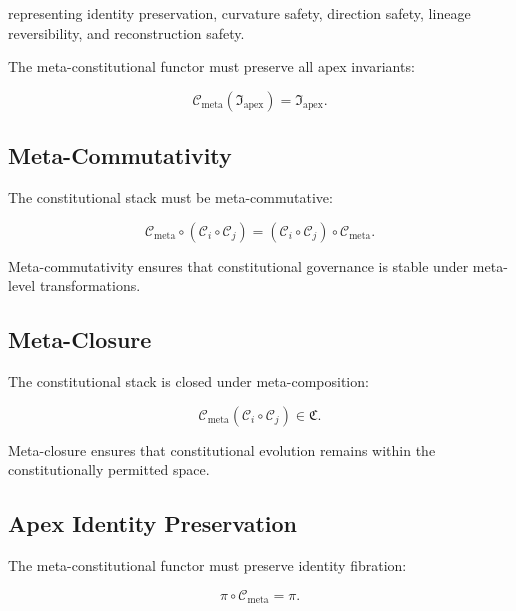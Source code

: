 representing identity preservation, curvature safety, direction safety,
lineage reversibility, and reconstruction safety.

The meta-constitutional functor must preserve all apex invariants:

\[
\mathcal{C}_{\mathrm{meta}}(\mathfrak{I}_{\mathrm{apex}})
=
\mathfrak{I}_{\mathrm{apex}}.
\]


\subsection{Meta-Commutativity}

The constitutional stack must be meta-commutative:

\[
\mathcal{C}_{\mathrm{meta}}
\circ
(\mathcal{C}_i \circ \mathcal{C}_j)
=
(\mathcal{C}_i \circ \mathcal{C}_j)
\circ
\mathcal{C}_{\mathrm{meta}}.
\]

Meta-commutativity ensures that constitutional governance is stable under
meta-level transformations.


\subsection{Meta-Closure}

The constitutional stack is closed under meta-composition:

\[
\mathcal{C}_{\mathrm{meta}}(\mathcal{C}_i \circ \mathcal{C}_j)
\in
\mathfrak{C}.
\]

Meta-closure ensures that constitutional evolution remains within the
constitutionally permitted space.


\subsection{Apex Identity Preservation}

The meta-constitutional functor must preserve identity fibration:

\[
\pi \circ \mathcal{C}_{\mathrm{meta}} = \pi.
\]

